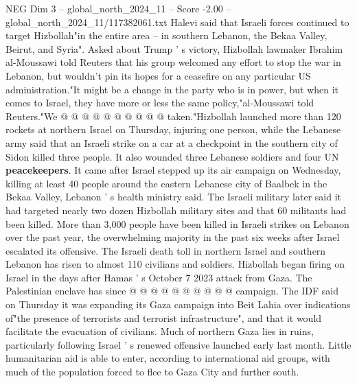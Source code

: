 \begin{textsample}{NEG Dim 3 – global\_north\_2024\_11 – Score -2.00 – global\_north\_2024\_11/117382061.txt}
Halevi said that Israeli forces continued to target Hizbollah"in the entire area -- in southern Lebanon, the Bekaa Valley, Beirut, and Syria".
Asked about Trump ' s victory, Hizbollah lawmaker Ibrahim al-Moussawi told Reuters that his group welcomed any effort to stop the war in Lebanon, but wouldn't pin its hopes for a ceasefire on any particular US administration."It might be a change in the party who is in power, but when it comes to Israel, they have more or less the same policy,"al-Moussawi told Reuters."We @ @ @ @ @ @ @ @ @ @ taken."Hizbollah launched more than 120 rockets at northern Israel on Thursday, injuring one person, while the Lebanese army said that an Israeli strike on a car at a checkpoint in the southern city of Sidon killed three people.
It also wounded three Lebanese soldiers and four UN \textbf{peacekeepers}.
It came after Israel stepped up its air campaign on Wednesday, killing at least 40 people around the eastern Lebanese city of Baalbek in the Bekaa Valley, Lebanon ' s health ministry said.
The Israeli military later said it had targeted nearly two dozen Hizbollah military sites and that 60 militants had been killed.
More than 3,000 people have been killed in Israeli strikes on Lebanon over the past year, the overwhelming majority in the past six weeks after Israel escalated its offensive.
The Israeli death toll in northern Israel and southern Lebanon has risen to almost 110 civilians and soldiers.
Hizbollah began firing on Israel in the days after Hamas ' s October 7 2023 attack from Gaza.
The Palestinian enclave has since @ @ @ @ @ @ @ @ @ @ campaign.
The IDF said on Thursday it was expanding its Gaza campaign into Beit Lahia over indications of"the presence of terrorists and terrorist infrastructure", and that it would facilitate the evacuation of civilians.
Much of northern Gaza lies in ruins, particularly following Israel ' s renewed offensive launched early last month.
Little humanitarian aid is able to enter, according to international aid groups, with much of the population forced to flee to Gaza City and further south.

\end{textsample}
